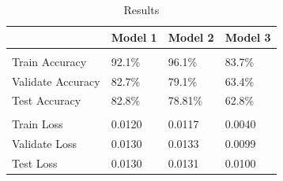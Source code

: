 \documentclass{article}
\begin{document}
\begin{table}[htbp]
  \centering
  \caption{Results}
    \begin{tabular}{l|lll}
          & Model 1 & Model 2 & Model 3 \\\hline \\ [-1.5ex]
    Train Accuracy & 92.1\%    & 96.1\% & 83.7\%     \\
    Validate Accuracy &   82.7\%  & 79.1\% & 63.4\%     \\
    Test Accuracy & 82.8\%    & 78.81\%  & 62.8\%    \\\hline \\ [-1.5ex]
    Train Loss & 0.0120    & 0.0117 & 0.0040     \\
    Validate Loss   & 0.0130    & 0.0133 & 0.0099   \\
    Test Loss & 0.0130    & 0.0131 & 0.0100     \\
    \end{tabular}%
  \label{tab:addlabel}%
\end{table}%
\end{document}
